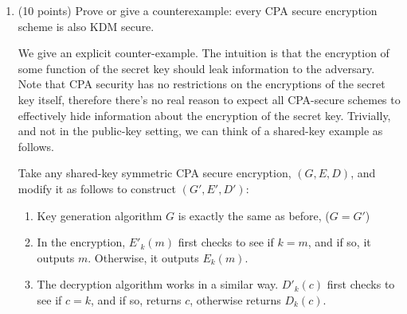 \documentclass{article}
\begin{document}
\begin{enumerate}[,label=\alph*.]%

\item{}
(10 points) Prove or give a counterexample: every CPA secure encryption scheme is also KDM secure.                                                                                                                                                                                                                                                                                  %

We give an explicit counter-example. The intuition is that the encryption of some function of the secret
key should leak information to the adversary. Note that CPA security has no restrictions on the 
encryptions of the secret key itself, therefore there's no real reason to expect all CPA-secure 
schemes to effectively hide information about the encryption of the secret key. Trivially, and 
not in the public-key setting, we can think of a shared-key example as follows.%

Take any shared-key symmetric CPA secure encryption, $(G,E,D)$, and modify it as follows to construct
$(G',E',D')$:%

\begin{enumerate}[noitemsep,topsep=\mdcompacttopsep]%

\item{}Key generation algorithm $G$ is exactly the same as before, ($G = G'$)%

\item{}In the encryption, $E'_k(m)$ first checks to see if $k = m$, and if so, it outputs $m$. Otherwise,
it outputs $E_k(m)$.%

\item{}The decryption algorithm works in a similar way. $D'_k(c)$ first checks to see if $c = k$, and 
if so, returns $c$, otherwise returns $D_k(c)$.%
\end{enumerate}%


\end{enumerate}
\end{document}
